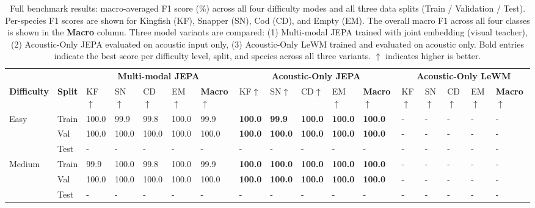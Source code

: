 \begin{table}[t]
\centering
\caption{%
  Full benchmark results: macro-averaged F1 score (\%) across all four difficulty modes and all three data splits (Train / Validation / Test).
  Per-species F1 scores are shown for Kingfish (KF), Snapper (SN), Cod (CD), and Empty (EM).
  The overall macro F1 across all four classes is shown in the \textbf{Macro} column.
  Three model variants are compared: (1) Multi-modal JEPA trained with joint embedding (visual teacher),
  (2) Acoustic-Only JEPA evaluated on acoustic input only,
  (3) Acoustic-Only LeWM trained and evaluated on acoustic only.
  Bold entries indicate the best score per difficulty level, split, and species across all three variants.
  $\uparrow$ indicates higher is better.
}
\label{tab:combined_results}
\setlength{\tabcolsep}{3.5pt}
\small
\begin{tabular}{@{}ll lllll lllll lllll@{}}
\toprule
& & \multicolumn{5}{c}{\textbf{Multi-modal JEPA}} 
  & \multicolumn{5}{c}{\textbf{Acoustic-Only JEPA}} 
  & \multicolumn{5}{c}{\textbf{Acoustic-Only LeWM}} \\
\cmidrule(lr){3-7} \cmidrule(lr){8-12} \cmidrule(lr){13-17}
\textbf{Difficulty} & \textbf{Split} 
  & KF$\uparrow$ & SN$\uparrow$ & CD$\uparrow$ & EM$\uparrow$ & \textbf{Macro}$\uparrow$
  & KF$\uparrow$ & SN$\uparrow$ & CD$\uparrow$ & EM$\uparrow$ & \textbf{Macro}$\uparrow$
  & KF$\uparrow$ & SN$\uparrow$ & CD$\uparrow$ & EM$\uparrow$ & \textbf{Macro}$\uparrow$ \\
\midrule
\multirow{3}{*}{Easy}
  & Train & 100.0 & 99.9 & 99.8 & 100.0 & 99.9 & \textbf{100.0} & \textbf{99.9} & \textbf{100.0} & \textbf{100.0} & \textbf{100.0} & - & - & - & - & - \\
  & Val & 100.0 & 100.0 & 100.0 & 100.0 & 100.0 & \textbf{100.0} & \textbf{100.0} & \textbf{100.0} & \textbf{100.0} & \textbf{100.0} & - & - & - & - & - \\
  & Test & - & - & - & - & - & - & - & - & - & - & - & - & - & - & - \\
\midrule
\multirow{3}{*}{Medium}
  & Train & 99.9 & 100.0 & 99.8 & 100.0 & 99.9 & \textbf{100.0} & \textbf{100.0} & \textbf{100.0} & \textbf{100.0} & \textbf{100.0} & - & - & - & - & - \\
  & Val & 100.0 & 100.0 & 100.0 & 100.0 & 100.0 & \textbf{100.0} & \textbf{100.0} & \textbf{100.0} & \textbf{100.0} & \textbf{100.0} & - & - & - & - & - \\
  & Test & - & - & - & - & - & - & - & - & - & - & - & - & - & - & - \\

\end{tabular}
\end{table}
